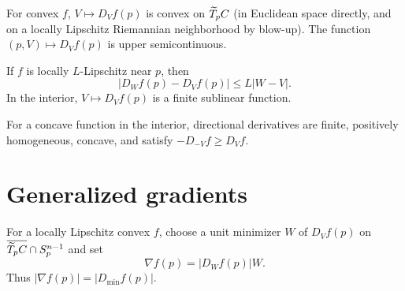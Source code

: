 \begin{lemma}
\label{lem:chow-iii-h26-directional-convexity-usc}

For convex $f$, $V\mapsto D_Vf(p)$ is convex on $\widetilde T_pC$ (in Euclidean space directly,
and on a locally Lipschitz Riemannian neighborhood by blow-up).  The function
$(p,V)\mapsto D_Vf(p)$ is upper semicontinuous.
\end{lemma}

\begin{lemma}
\label{lem:chow-iii-h27-directional-sublinear}

If $f$ is locally $L$-Lipschitz near $p$, then
\[
|D_Wf(p)-D_Vf(p)|\le L|W-V|.
\]
In the interior, $V\mapsto D_Vf(p)$ is a finite sublinear function.
\end{lemma}

\begin{remark}
\label{rem:chow-iii-h28-concave-directional-derivatives}
For a concave function in the interior, directional derivatives are finite, positively
homogeneous, concave, and satisfy $-D_{-V}f\ge D_Vf$.
\end{remark}

\section{Generalized gradients}

\begin{definition}
\label{def:chow-iii-h29-generalized-gradient}

For a locally Lipschitz convex $f$, choose a unit minimizer $W$ of $D_Vf(p)$ on
$\overline{\widetilde T_pC}\cap S_p^{n-1}$ and set
\[
\nabla f(p)=|D_Wf(p)|W.
\]
Thus $|\nabla f(p)|=|D_{\min}f(p)|$.
\end{definition}

